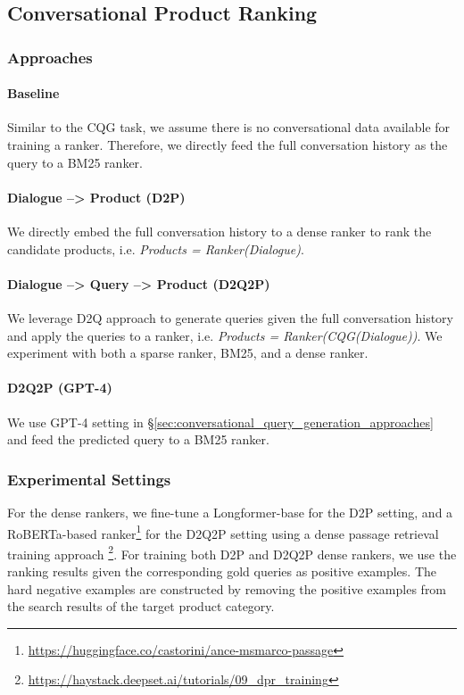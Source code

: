 \subsection{Conversational Product Ranking}

\subsubsection{Approaches}%
\paragraph{Baseline} Similar to the CQG task, we assume there is no conversational data available for training a ranker. Therefore, we directly feed the full conversation history as the query to a BM25 ranker.

\paragraph{Dialogue --> Product (D2P)} We directly embed the full conversation history to a dense ranker to rank the candidate products, i.e. \textit{Products = Ranker(Dialogue)}. %

\paragraph{Dialogue --> Query --> Product (D2Q2P)} We leverage D2Q approach to generate queries given the full conversation history and apply the queries to a ranker, i.e. \textit{Products = Ranker(CQG(Dialogue))}. We experiment with both a sparse ranker, BM25, and a dense ranker.

\paragraph{D2Q2P (GPT-4)} We use GPT-4 setting in \S\ref{sec:conversational_query_generation_approaches} and feed the predicted query to a BM25 ranker.

\subsubsection{Experimental Settings}
For the dense rankers, we fine-tune a Longformer-base \cite{beltagy2020longformer} for the D2P setting, and a RoBERTa-based ranker\footnote{\url{https://huggingface.co/castorini/ance-msmarco-passage}} for the D2Q2P setting using a dense passage retrieval \cite{karpukhin-etal-2020-dense} training approach \footnote{\url{https://haystack.deepset.ai/tutorials/09_dpr_training}}. For training both D2P and D2Q2P dense rankers, we use the ranking results given the corresponding gold queries as positive examples. The hard negative examples are constructed by removing the positive examples from the search results of the target product category.

